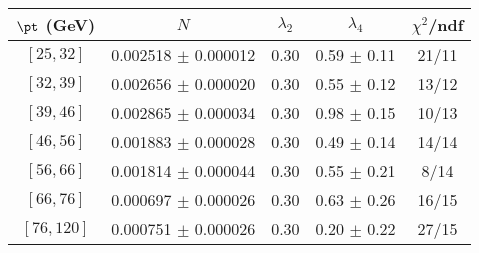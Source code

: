 \begin{tabular}{c||c|c|c|c}
$\pt$ (GeV) & $N$ & $\lambda_{2}$ & $\lambda_4$  & $\chi^2$/ndf  \\
\hline
$[25, 32]$ & 0.002518 $\pm$ 0.000012 & 0.30 & 0.59 $\pm$ 0.11 & 21/11\\
$[32, 39]$ & 0.002656 $\pm$ 0.000020 & 0.30 & 0.55 $\pm$ 0.12 & 13/12\\
$[39, 46]$ & 0.002865 $\pm$ 0.000034 & 0.30 & 0.98 $\pm$ 0.15 & 10/13\\
$[46, 56]$ & 0.001883 $\pm$ 0.000028 & 0.30 & 0.49 $\pm$ 0.14 & 14/14\\
$[56, 66]$ & 0.001814 $\pm$ 0.000044 & 0.30 & 0.55 $\pm$ 0.21 & 8/14\\
$[66, 76]$ & 0.000697 $\pm$ 0.000026 & 0.30 & 0.63 $\pm$ 0.26 & 16/15\\
$[76, 120]$ & 0.000751 $\pm$ 0.000026 & 0.30 & 0.20 $\pm$ 0.22 & 27/15\\
\end{tabular}
